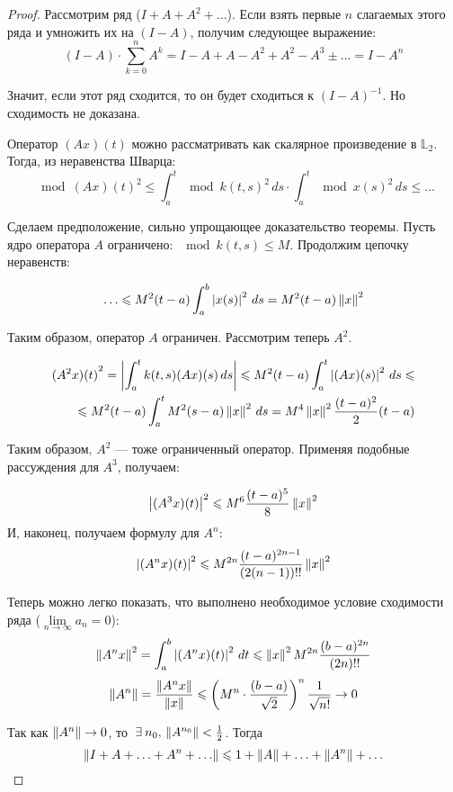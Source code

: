 \documentclass[12pt]{article}
\begin{document}
	\begin{proof}
		Рассмотрим ряд ($I + A + A^2 + \ldots$). Если взять первые $n$ слагаемых этого ряда и умножить их на $(I - A)$, 
		получим следующее выражение:
		$$(I-A) \cdot \sum_{k=0}^n A^k = I - A + A - A^2 + A^2 - A^3 \pm\ldots = I - A^n$$
		
		Значит, если этот ряд сходится, то он будет сходиться к $(I - A)^{-1}$. Но сходимость не доказана.
		
		Оператор $(Ax)(t)$ можно рассматривать как скалярное произведение в $\mathbb{L}_2$. Тогда, из неравенства Шварца:
		$$\mod{(Ax)(t)}^2 \leq 
		  \int_a^t \mod{k(t,s)}^2 \,ds \cdot \int_a^t \mod{x(s)}^2 \,ds \leq \ldots$$
		  
		Сделаем предположение, сильно упрощающее доказательство теоремы. Пусть ядро оператора $A$ 
		ограничено: $\mod{k(t,s)} \leq M$. Продолжим цепочку неравенств:
		
		$$\ldots \leqslant M^2(t-a) \int_a^b \left| x(s) \right|^2 \,ds = M^2(t-a)\left\| x \right\|^2$$
		
		Таким образом, оператор $A$ ограничен. Рассмотрим теперь $A^2$.
		
		\begin{align*}
			{(A^2x)(t)}^2 = \left| \int_a^t k(t,s)(Ax)(s) \,ds \right| \leqslant M^2(t-a)\int_a^t\left| (Ax)(s) \right|^2\,ds \leqslant \\ 
			\leqslant M^2(t-a)\int_a^tM^2(s-a)\left\| x \right\|^2 \,ds = M^4 \left\| x \right\|^2 \frac{(t-a)^2}{2}(t-a)
		\end{align*}
		
		Таким образом, $A^2$ --- тоже ограниченный оператор. Применяя подобные рассуждения для $A^3$, получаем:
		
		$$\left| (A^3x)(t) \right|^2 \leqslant M^6 \frac{(t-a)^5}{8}\left\| x \right\|^2 $$
		И, наконец, получаем формулу для $A^n$:
		$$\left| (A^nx)(t) \right|^2 \leqslant M^{2n} \frac{(t-a)^{2n-1}}{(2(n-1))!!}\left\| x \right\|^2 $$
		
		Теперь можно легко показать, что выполнено необходимое условие сходимости ряда 
		($\underset{n\rightarrow\infty}{\lim} a_n = 0$):
		$$\left\| A^nx \right\|^2 = \int_a^b \left| (A^nx)(t) \right|^2 \,dt \leqslant \left\| x \right\|^2 M^{2n} \frac{(b-a)^{2n}}{(2n)!!}$$
		$$\left\| A^n \right\| = \frac{\left\| A^nx \right\|}{\left\| x \right\|} \leqslant 
		  \left( M^n\cdot\frac{(b-a)}{\sqrt{2}}\right)^n \frac{1}{\sqrt{n!}} \rightarrow 0$$
		  
		Так как $\left\| A^n \right\| \rightarrow 0$, то $\exists n_0,\,\norm{A^{n_0}} < \frac{1}{2}$. Тогда
		$$\left\| I + A + \ldots + A^n + \ldots \right\| \leqslant 1 + \left\| A \right\| + \ldots + \left\| A^n \right\| + \ldots$$
		

\end{proof}
\end{document}

